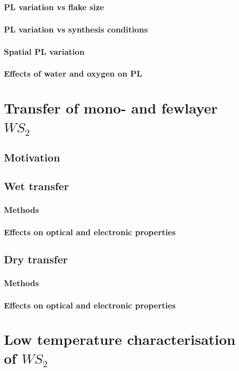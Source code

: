 \documentclass[12pt]{article}
\begin{document}
		\subsubsection{PL variation vs flake size}
		\subsubsection{PL variation vs synthesis conditions}
		\subsubsection{Spatial PL variation}
		\subsubsection{Effects of water and oxygen on PL}
\section{Transfer of mono- and fewlayer $WS_2$}
	\subsection{Motivation}
	\subsection{Wet transfer}
		\subsubsection{Methods}
		\subsubsection{Effects on optical and electronic properties}
	\subsection{Dry transfer}
		\subsubsection{Methods}
		\subsubsection{Effects on optical and electronic properties}
\section{Low temperature characterisation of $WS_2$}
\end{document}
